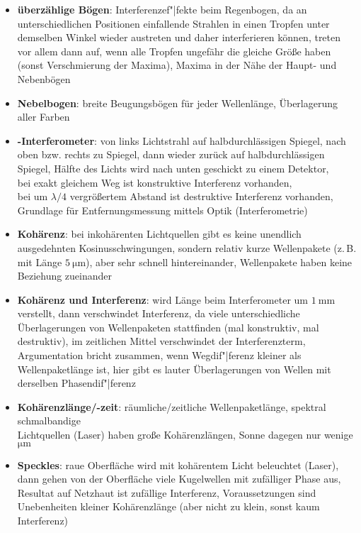 \linie
\begin{itemize}
    \item
    \textbf{überzählige Bögen}:
    Interferenzef"|fekte beim Regenbogen, da
    an unterschiedlichen Positionen einfallende Strahlen in einen Tropfen
    unter demselben Winkel wieder austreten und daher interferieren können,
    treten vor allem dann auf, wenn alle Tropfen ungefähr die gleiche Größe
    haben (sonst Verschmierung der Maxima),
    Maxima in der Nähe der Haupt- und Nebenbögen
    
    \item
    \textbf{Nebelbogen}:
    breite Beugungsbögen für jeder Wellenlänge, Überlagerung aller Farben
\end{itemize}
\linie
\pagebreak
\begin{itemize}
    \item
    \textbf{-Interferometer}:
    von links Lichtstrahl auf halbdurchlässigen Spiegel, nach oben bzw. rechts
    zu Spiegel, dann wieder zurück auf halbdurchlässigen Spiegel,
    Hälfte des Lichts wird nach unten geschickt zu einem Detektor, \\
    bei exakt gleichem Weg ist konstruktive Interferenz vorhanden, \\
    bei um $\lambda/4$ vergrößertem Abstand ist destruktive Interferenz
    vorhanden, \\
    Grundlage für Entfernungsmessung mittels Optik (Interferometrie)
    
    \item
    \textbf{Kohärenz}:
    bei inkohärenten Lichtquellen gibt es keine unendlich ausgedehnten
    Kosinusschwingungen, sondern relativ kurze Wellenpakete
    (z.\,B. mit Länge $\SI{5}{\micro\meter}$), aber sehr schnell hintereinander,
    Wellenpakete haben keine Beziehung zueinander
    
    \item
    \textbf{Kohärenz und Interferenz}:
    wird Länge beim Interferometer um $\SI{1}{\milli\meter}$ verstellt, dann
    verschwindet Interferenz, da viele unterschiedliche Überlagerungen
    von Wellenpaketen stattfinden (mal konstruktiv, mal destruktiv),
    im zeitlichen Mittel verschwindet der Interferenzterm,
    Argumentation bricht zusammen, wenn Wegdif"|ferenz kleiner als
    Wellenpaketlänge ist,
    hier gibt es lauter Überlagerungen von Wellen mit derselben
    Phasendif"|ferenz
    
    \item
    \textbf{Kohärenzlänge/-zeit}:
    räumliche/zeitliche Wellenpaketlänge,
    spektral schmalbandige \\
    Lichtquellen (Laser) haben große Kohärenzlängen,
    Sonne dagegen nur wenige $\si{\micro\meter}$
    
    \item
    \textbf{Speckles}:
    raue Oberfläche wird mit kohärentem Licht beleuchtet (Laser),
    dann gehen von der Oberfläche viele Kugelwellen mit zufälliger Phase
    aus, Resultat auf Netzhaut ist zufällige Interferenz,
    Voraussetzungen sind Unebenheiten kleiner Kohärenzlänge
    (aber nicht zu klein, sonst kaum Interferenz)
\end{itemize}
